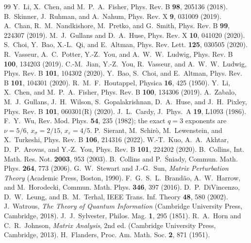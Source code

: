 \documentclass[aps,prx,reprint,superscriptaddress,nobibnotes,longbibliography]{revtex4-2}
\theoremstyle{remark}
\begin{document}
\begin{thebibliography}{99}
 Y.~Li, X.~Chen, and M.~P.~A.~Fisher, Phys. Rev. B \textbf{98}, 205136 (2018).
 B.~Skinner, J.~Ruhman, and A.~Nahum, Phys. Rev. X \textbf{9}, 031009 (2019).
 A.~Chan, R.~M.~Nandkishore, M.~Pretko, and G.~Smith, Phys. Rev. B \textbf{99}, 224307 (2019).
 M.~J.~Gullans and D.~A.~Huse, Phys. Rev. X \textbf{10}, 041020 (2020).
 S.~Choi, Y.~Bao, X.-L.~Qi, and E.~Altman, Phys. Rev. Lett. \textbf{125}, 030505 (2020).
 R.~Vasseur, A.~C.~Potter, Y.-Z.~You, and A.~W.~W.~Ludwig, Phys. Rev. B \textbf{100}, 134203 (2019).
 C.-M.~Jian, Y.-Z.~You, R.~Vasseur, and A.~W.~W.~Ludwig, Phys. Rev. B \textbf{101}, 104302 (2020).
 Y.~Bao, S.~Choi, and E.~Altman, Phys. Rev. B \textbf{101}, 104301 (2020).
 R.~M.~F.~Houtappel, Physica \textbf{16}, 425 (1950).
 Y.~Li, X.~Chen, and M.~P.~A.~Fisher, Phys. Rev. B \textbf{100}, 134306 (2019).
 A.~Zabalo, M.~J.~Gullans, J.~H.~Wilson, S.~Gopalakrishnan, D.~A.~Huse, and J.~H.~Pixley, Phys. Rev. B \textbf{101}, 060301(R) (2020).
 J.~L.~Cardy, J.\ Phys.\ A \textbf{19}, L1093 (1986).
 F.~Y.~Wu, Rev. Mod. Phys. \textbf{54}, 235 (1982); the exact $q=3$ exponents are $\nu=5/6$, $x_\sigma=2/15$, $x_\varepsilon=4/5$.
 P.~Sierant, M.~Schir\`o, M.~Lewenstein, and X.~Turkeshi, Phys. Rev. B \textbf{106}, 214316 (2022).
 W.-T.~Kuo, A.~A.~Akhtar, D.~P.~Arovas, and Y.-Z.~You, Phys. Rev. B \textbf{101}, 224202 (2020).
 B.~Collins, Int. Math. Res. Not. \textbf{2003}, 953 (2003).
 B.~Collins and P.~\'Sniady, Commun. Math. Phys. \textbf{264}, 773 (2006).
 G.~W.~Stewart and J.-G.~Sun, \emph{Matrix Perturbation Theory} (Academic Press, Boston, 1990).
 F.~G.~S.~L.~Brand\~ao, A.~W.~Harrow, and M.~Horodecki, Commun. Math. Phys. \textbf{346}, 397 (2016).
 D.~P.~DiVincenzo, D.~W.~Leung, and B.~M.~Terhal, IEEE Trans. Inf. Theory \textbf{48}, 580 (2002).
 J.~Watrous, \emph{The Theory of Quantum Information} (Cambridge University Press, Cambridge, 2018).
 J.~J.~Sylvester, Philos. Mag. \textbf{1}, 295 (1851).
 R.~A.~Horn and C.~R.~Johnson, \emph{Matrix Analysis}, 2nd ed. (Cambridge University Press, Cambridge, 2013).
 H.~Flanders, Proc. Am. Math. Soc. \textbf{2}, 871 (1951).

\end{thebibliography}
\end{document}
